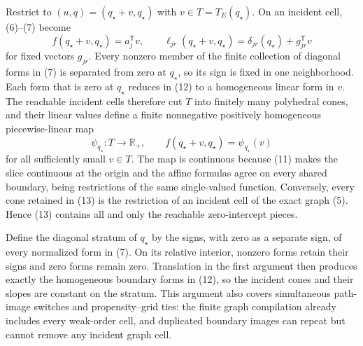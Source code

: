 Restrict to \((u,q)=(q_\star+v,q_\star)\) with \(v\in T=T_E(q_\star)\).  On an incident cell, (6)--(7) become
\[
 f(q_\star+v,q_\star)=a_j^{\mathsf T}v,
 \qquad
 \ell_{jr}(q_\star+v,q_\star)
 =\delta_{jr}(q_\star)+g_{jr}^{\mathsf T}v
\tag{12}
\]
for fixed vectors \(g_{jr}\).  Every nonzero member of the finite collection of diagonal forms in (7) is separated from zero at \(q_\star\), so its sign is fixed in one neighborhood.  Each form that is zero at \(q_\star\) reduces in (12) to a homogeneous linear form in \(v\).  The reachable incident cells therefore cut \(T\) into finitely many polyhedral cones, and their linear values define a finite nonnegative positively homogeneous piecewise-linear map
\[
 \psi_{q_\star}:T\longrightarrow\mathbb R_+,
 \qquad
 f(q_\star+v,q_\star)=\psi_{q_\star}(v)
\tag{13}
\]
for all sufficiently small \(v\in T\).  The map is continuous because (11) makes the slice continuous at the origin and the affine formulas agree on every shared boundary, being restrictions of the same single-valued function.  Conversely, every cone retained in (13) is the restriction of an incident cell of the exact graph (5).  Hence (13) contains all and only the reachable zero-intercept pieces.

Define the diagonal stratum of \(q_\star\) by the signs, with zero as a separate sign, of every normalized form in (7).  On its relative interior, nonzero forms retain their signs and zero forms remain zero.  Translation in the first argument then produces exactly the homogeneous boundary forms in (12), so the incident cones and their slopes are constant on the stratum.  This argument also covers simultaneous path-image switches and propensity--grid ties: the finite graph compilation already includes every weak-order cell, and duplicated boundary images can repeat but cannot remove any incident graph cell.

